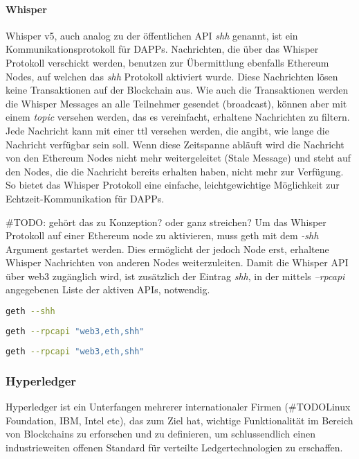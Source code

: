 \paragraph{Whisper}
\label{para:Whisper}
Whisper v5, auch analog zu der öffentlichen API \emph{shh} genannt, ist ein Kommunikationsprotokoll für \acrfull{DAPPs}. Nachrichten, die über das Whisper Protokoll verschickt werden, benutzen zur Übermittlung ebenfalls Ethereum Nodes, auf welchen das \emph{shh} Protokoll aktiviert wurde. Diese Nachrichten lösen keine Transaktionen auf der Blockchain aus. Wie auch die Transaktionen werden die Whisper Messages an alle Teilnehmer gesendet (broadcast), können aber mit einem \emph{topic} versehen werden, das es vereinfacht, erhaltene Nachrichten zu filtern. Jede Nachricht kann mit einer \acrfull{ttl} versehen werden, die angibt, wie lange die Nachricht verfügbar sein soll. Wenn diese Zeitspanne abläuft wird die Nachricht von den Ethereum Nodes nicht mehr weitergeleitet (Stale Message) und steht auf den Nodes, die die Nachricht bereits erhalten haben, nicht mehr zur Verfügung. So bietet das Whisper Protokoll eine einfache, leichtgewichtige Möglichkeit zur Echtzeit-Kommunikation für \acrshort{DAPPs}.

\#TODO: gehört das zu Konzeption? oder ganz streichen? Um das Whisper Protokoll auf einer Ethereum node zu aktivieren, muss geth mit dem \emph{-shh} Argument gestartet werden. Dies ermöglicht der jedoch Node erst, erhaltene Whisper Nachrichten von anderen Nodes weiterzuleiten. Damit die Whisper API über web3 zugänglich wird, ist zusätzlich der Eintrag \emph{shh}, in der mittels \emph{--rpcapi} angegebenen Liste der aktiven APIs, notwendig.
\begin{lstlisting}[language=bash,caption=Beispiel für die Aktivierung des shh Protokolls auf der Ethereum Node]
geth --shh
\end{lstlisting}
\begin{lstlisting}[language=bash,caption={Beispiel für die Aktivierung der web3, eth und shh API}]
geth --rpcapi "web3,eth,shh"
\end{lstlisting}
\begin{lstlisting}[language=bash,caption={Beispiel für die Aktivierung des shh Protokolls und der web3, eth und shh API}]
geth --rpcapi "web3,eth,shh"
\end{lstlisting}

\subsubsection{Hyperledger}
Hyperledger ist ein Unterfangen mehrerer internationaler Firmen (\#TODOLinux Foundation, IBM, Intel etc), das zum Ziel hat, wichtige Funktionalität im Bereich von Blockchains zu erforschen und zu definieren, um schlussendlich einen industrieweiten offenen Standard für verteilte Ledgertechnologien zu erschaffen.\cite{wiki.hyperledger.org/welcome}

